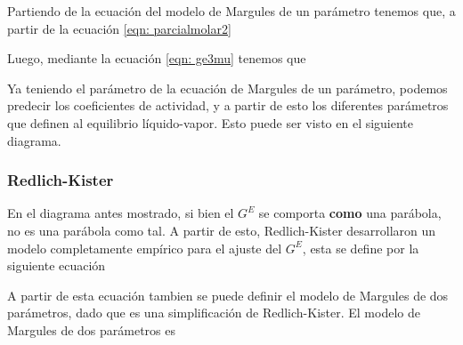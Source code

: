 Partiendo de la ecuación del modelo de Margules de un parámetro tenemos que, a partir de la ecuación \ref{eqn: parcialmolar2}


Luego, mediante la ecuación \ref{eqn: ge3mu} tenemos que


Ya teniendo el parámetro de la ecuación de Margules de un parámetro, podemos predecir los coeficientes de actividad, y a partir de esto los diferentes parámetros que definen al equilibrio líquido-vapor. 
Esto puede ser visto en el siguiente diagrama.


\subsubsection{Redlich-Kister}

En el diagrama antes mostrado, si bien el $G^{E}$ se comporta \textbf{como} una parábola, no es una parábola como tal. A partir de esto, Redlich-Kister desarrollaron
un modelo completamente empírico para el ajuste del $G^{E}$, esta se define por la siguiente ecuación


A partir de esta ecuación tambien se puede definir el modelo de Margules de dos parámetros, dado que es una simplificación de Redlich-Kister.
El modelo de Margules de dos parámetros es 

